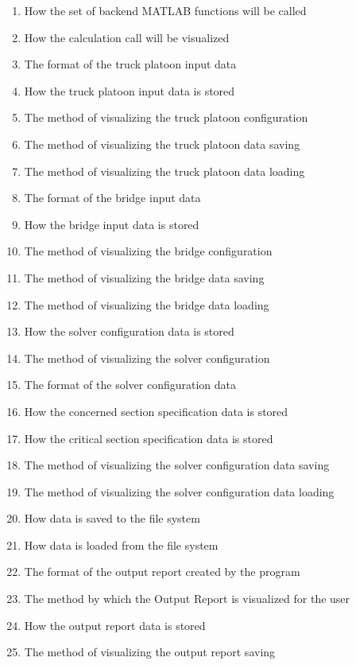\documentclass[12pt, titlepage]{article}
\begin{document}
\begin{enumerate}
    \item How the set of backend MATLAB functions will be called
    \item How the calculation call will be visualized
    \item The format of the truck platoon input data
    \item How the truck platoon input data is stored
    \item The method of visualizing the truck platoon configuration
    \item The method of visualizing the truck platoon data saving
    \item The method of visualizing the truck platoon data loading
    \item The format of the bridge input data
    \item How the bridge input data is stored
    \item The method of visualizing the bridge configuration
    \item The method of visualizing the bridge data saving
    \item The method of visualizing the bridge data loading
    \item How the solver configuration data is stored
    \item The method of visualizing the solver configuration
    \item The format of the solver configuration data
    \item How the concerned section specification data is stored
    \item How the critical section specification data is stored
    \item The method of visualizing the solver configuration data saving
    \item The method of visualizing the solver configuration data loading
    \item How data is saved to the file system 
    \item How data is loaded from the file system 
    \item The format of the output report created by the program
    \item The method by which the Output Report is visualized for the user
    \item How the output report data is stored
    \item The method of visualizing the output report saving
\end{enumerate}    
\end{document}
